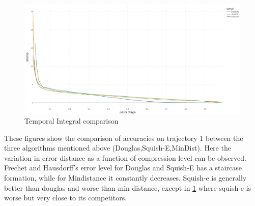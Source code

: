 \begin{figure}[!h]
	\centering
	\includegraphics[width=1\linewidth]{figures/Stats/atemp_comp.jpg}
	\caption{Temporal Integral comparison}
	\label{fig:comp_at}
\end{figure}

These figures show the comparison of accuracies on trajectory 1 between the three algorithms mentioned above (Douglas,Squish-E,MinDist). Here the variation in error distance as a function of compression level can be observed. Frechet and Hausdorff's error level for Douglas and Squish-E has a staircase formation, while for Mindistance it constantly decreases. Squish-e is generally better than douglas and worse than min distance, except in \ref{fig:comp_at} where squish-e is worse but very close to its competitors. 
